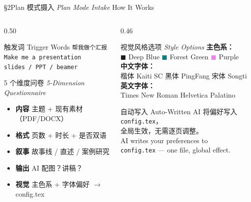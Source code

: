 \documentclass[aspectratio=169,10pt]{beamer}
\newcommand{\EN}[1]{\textit{#1}}
\newcommand{\sectag}[1]{\textmd{\small\normalfont\textcolor{deepblue!60}{#1}}}
\begin{document}
\begin{frame}{\S2\quad Plan 模式摄入 \EN{Plan Mode Intake} \sectag{How It Works}}
  \begin{columns}[T]
    \begin{column}{0.50\textwidth}
      \begin{exampleblock}{\small 触发词 Trigger Words}
        \footnotesize
        \texttt{帮我做个汇报}\\
        \texttt{Make me a presentation}\\
        \texttt{slides / PPT / beamer}
      \end{exampleblock}
      \vspace{4pt}
      \begin{block}{\small 5 个维度问卷 \EN{5-Dimension Questionnaire}}
        \footnotesize
        \begin{itemize}
          \item \textbf{内容} 主题 + 现有素材（PDF/DOCX）
          \item \textbf{格式} 页数 + 时长 + 是否双语
          \item \textbf{叙事} 故事线 / 直述 / 案例研究
          \item \textbf{输出} AI 配图？讲稿？
          \item \alert{\textbf{视觉}} 主色系 + 字体偏好 $\to$ config.tex
        \end{itemize}
      \end{block}
    \end{column}
    \begin{column}{0.46\textwidth}
      \begin{alertblock}{\small 视觉风格选项 \EN{Style Options}}
        \footnotesize
        \textbf{主色系：}\\
        \textcolor{deepblue}{$\blacksquare$} Deep Blue \quad
        \textcolor{teal}{$\blacksquare$} Forest Green \quad
        \textcolor{violet}{$\blacksquare$} Purple\\[4pt]
        \textbf{中文字体：}\\
        楷体 Kaiti SC \textbullet{} 黑体 PingFang \textbullet{} 宋体 Songti\\[4pt]
        \textbf{英文字体：}\\
        Times New Roman \textbullet{} Helvetica \textbullet{} Palatino
      \end{alertblock}
      \vspace{4pt}
      \begin{exampleblock}{\small 自动写入 Auto-Written}
        \footnotesize
        AI 将偏好写入 \texttt{config.tex}，\\
        全局生效，无需逐页调整。\\[2pt]
        AI writes your preferences to\\
        \texttt{config.tex} — one file, global effect.
      \end{exampleblock}
    \end{column}
  \end{columns}
\end{frame}
\end{document}
